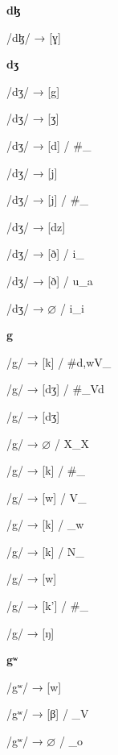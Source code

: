 \begin{center}\textbf{dɮ}\end{center}
\begin{multicols}{4}
\noindent /dɮ/ → [ɣ]
\end{multicols}

\begin{center}\textbf{dʒ}\end{center}
\begin{multicols}{4}
\noindent /dʒ/ → [g]

\noindent /dʒ/ → [ʒ]

\noindent /dʒ/ → [d] / \#\_

\noindent /dʒ/ → [j]

\noindent /dʒ/ → [j] / \#\_

\noindent /dʒ/ → [dz]

\noindent /dʒ/ → [ð] / i\_

\noindent /dʒ/ → [ð] / u\_a

\noindent /dʒ/ → $\varnothing$ / i\_i

\end{multicols}

\begin{center}\textbf{g}\end{center}
\begin{multicols}{4}
\noindent /g/ → [k] / \#{d,w}V\_

\noindent /g/ → [dʒ] / \#\_Vd

\noindent /g/ → [dʒ]

\noindent /g/ → $\varnothing$ / X\_X

\noindent /g/ → [k] / \#\_

\noindent /g/ → [w] / V\_

\noindent /g/ → [k] / \_w

\noindent /g/ → [k] / N\_

\noindent /g/ → [w]

\noindent /g/ → [k'] / \#\_

\noindent /g/ → [ŋ]

\end{multicols}

\begin{center}\textbf{gʷ}\end{center}
\begin{multicols}{4}
\noindent /gʷ/ → [w]

\noindent /gʷ/ → [β] / \_V

\noindent /gʷ/ → $\varnothing$ / \_o

\end{multicols}

